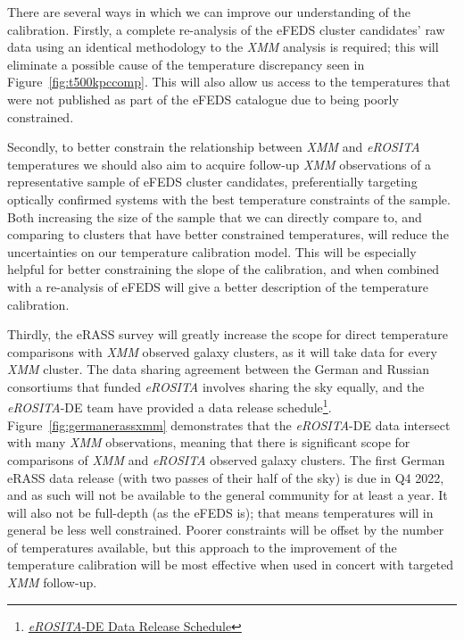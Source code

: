 \documentclass[fleqn,usenatbib]{mnras}
\begin{document}
There are several ways in which we can improve our understanding of the calibration. Firstly, a complete re-analysis of the eFEDS cluster candidates' raw data using an identical methodology to the {\em XMM} analysis is required; this will eliminate a possible cause of the temperature discrepancy seen in Figure~\ref{fig:t500kpccomp}. This will also allow us access to the temperatures that were not published as part of the eFEDS catalogue due to being poorly constrained. 

Secondly, to better constrain the relationship between {\em XMM} and {\em eROSITA} temperatures we should also aim to acquire follow-up {\em XMM} observations of a representative sample of eFEDS cluster candidates, preferentially targeting optically confirmed systems with the best temperature constraints of the sample. Both increasing the size of the sample that we can directly compare to, and comparing to clusters that have better constrained temperatures, will reduce the uncertainties on our temperature calibration model. This will be especially helpful for better constraining the slope of the calibration, and when combined with a re-analysis of eFEDS will give a better description of the temperature calibration.

Thirdly, the eRASS survey will greatly increase the scope for direct temperature comparisons with {\em XMM} observed galaxy clusters, as it will take data for every {\em XMM} cluster. The data sharing agreement between the German and Russian consortiums that funded {\em eROSITA} involves sharing the sky equally, and the {\em eROSITA}-DE team have provided a data release schedule\footnote{\href{https://erosita.mpe.mpg.de/erass/}{{\em eROSITA}-DE Data Release Schedule}}. Figure~\ref{fig:germanerassxmm} demonstrates that the {\em eROSITA}-DE data intersect with many {\em XMM} observations, meaning that there is significant scope for comparisons of {\em XMM} and {\em eROSITA} observed galaxy clusters. The first German eRASS data release (with two passes of their half of the sky) is due in Q4 2022, and as such will not be available to the general community for at least a year. It will also not be full-depth (as the eFEDS is); that means temperatures will in general be less well constrained. Poorer constraints will be offset by the number of temperatures available, but this approach to the improvement of the temperature calibration will be most effective when used in concert with targeted {\em XMM} follow-up.
\end{document}
